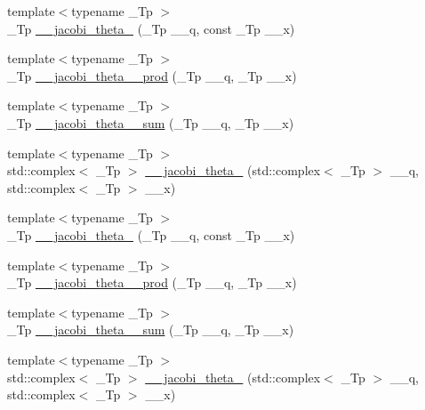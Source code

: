 \begin{DoxyCompactItemize}
\item 
{\footnotesize template$<$typename \+\_\+\+Tp $>$ }\\\+\_\+\+Tp \hyperlink{namespacestd_1_1____detail_a5aace3bea7c88443d5bceb503a0452d0}{\+\_\+\+\_\+jacobi\+\_\+theta\+\_} (\+\_\+\+Tp \+\_\+\+\_\+q, const \+\_\+\+Tp \+\_\+\+\_\+x)
\item 
{\footnotesize template$<$typename \+\_\+\+Tp $>$ }\\\+\_\+\+Tp \hyperlink{namespacestd_1_1____detail_acc790f257c25f021704f9c9e1ad9df29}{\+\_\+\+\_\+jacobi\+\_\+theta\+\_\+\_\+prod} (\+\_\+\+Tp \+\_\+\+\_\+q, \+\_\+\+Tp \+\_\+\+\_\+x)
\item 
{\footnotesize template$<$typename \+\_\+\+Tp $>$ }\\\+\_\+\+Tp \hyperlink{namespacestd_1_1____detail_a6eba88f5f854974b7fe7445e9b11a0e0}{\+\_\+\+\_\+jacobi\+\_\+theta\+\_\+\_\+sum} (\+\_\+\+Tp \+\_\+\+\_\+q, \+\_\+\+Tp \+\_\+\+\_\+x)
\item 
{\footnotesize template$<$typename \+\_\+\+Tp $>$ }\\std\+::complex$<$ \+\_\+\+Tp $>$ \hyperlink{namespacestd_1_1____detail_ac7a6c396a102438d2c104f344b4f6a72}{\+\_\+\+\_\+jacobi\+\_\+theta\+\_} (std\+::complex$<$ \+\_\+\+Tp $>$ \+\_\+\+\_\+q, std\+::complex$<$ \+\_\+\+Tp $>$ \+\_\+\+\_\+x)
\item 
{\footnotesize template$<$typename \+\_\+\+Tp $>$ }\\\+\_\+\+Tp \hyperlink{namespacestd_1_1____detail_a6a7102085368188062ef47100ce80239}{\+\_\+\+\_\+jacobi\+\_\+theta\+\_} (\+\_\+\+Tp \+\_\+\+\_\+q, const \+\_\+\+Tp \+\_\+\+\_\+x)
\item 
{\footnotesize template$<$typename \+\_\+\+Tp $>$ }\\\+\_\+\+Tp \hyperlink{namespacestd_1_1____detail_aef15a9b55f5f4ed8b1f6d6113ad0ef12}{\+\_\+\+\_\+jacobi\+\_\+theta\+\_\+\_\+prod} (\+\_\+\+Tp \+\_\+\+\_\+q, \+\_\+\+Tp \+\_\+\+\_\+x)
\item 
{\footnotesize template$<$typename \+\_\+\+Tp $>$ }\\\+\_\+\+Tp \hyperlink{namespacestd_1_1____detail_a07e080795e7f80c5a0b733d6bac49675}{\+\_\+\+\_\+jacobi\+\_\+theta\+\_\+\_\+sum} (\+\_\+\+Tp \+\_\+\+\_\+q, \+\_\+\+Tp \+\_\+\+\_\+x)
\item 
{\footnotesize template$<$typename \+\_\+\+Tp $>$ }\\std\+::complex$<$ \+\_\+\+Tp $>$ \hyperlink{namespacestd_1_1____detail_a1cb3d69015e808baeaf98cd3310f38c3}{\+\_\+\+\_\+jacobi\+\_\+theta\+\_} (std\+::complex$<$ \+\_\+\+Tp $>$ \+\_\+\+\_\+q, std\+::complex$<$ \+\_\+\+Tp $>$ \+\_\+\+\_\+x)

\end{DoxyCompactItemize}
